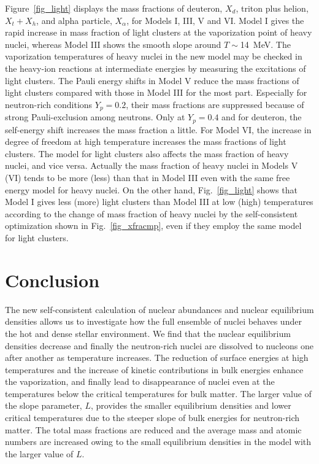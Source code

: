 \documentclass[preprint]{revtex4}
\begin{document}
{{{%
Figure~\ref{fig_light} displays the mass fractions of deuteron, $X_d$, triton plus helion, $X_t+X_h$, and alpha particle, $X_{\alpha}$, for  Models I, III, V and VI. 
{Model I gives the rapid increase in mass fraction of light clusters at the vaporization point of heavy nuclei, whereas Model III shows the smooth slope around $T\sim$14~MeV. 
The vaporization temperatures of heavy nuclei in the new model  may be checked in the heavy-ion reactions at intermediate energies by measuring  the excitations of light clusters.}
The Pauli energy shifts in  Model V reduce the mass fractions of light clusters compared with those in Model III for the most part. 
Especially for neutron-rich conditions $Y_p=0.2$, their mass fractions are suppressed because of strong Pauli-exclusion among neutrons. Only at $Y_p=0.4$ and for deuteron, the self-energy shift increases the mass fraction a little.
For Model VI, the increase in degree of freedom  at high temperature increases the mass fractions of light clusters.
The model for light clusters also affects the mass fraction of heavy nuclei,  and vice versa. Actually the mass fraction of heavy nuclei  in Models V (VI) tends to be more (less) than that in Model III even with the same free energy model for heavy nuclei.
On the other hand, Fig.~\ref{fig_light} shows that  Model I gives less (more) light clusters than Model III at low (high) temperatures according to the change of mass fraction of heavy nuclei by the self-consistent optimization shown in Fig.~\ref{fig_xfracmp}, 
even if they employ the same model for light clusters.

\section{Conclusion \label{sec:conc}}

The new self-consistent calculation of nuclear abundances and nuclear equilibrium densities 
allows us to investigate how the full ensemble of nuclei behaves under the hot and dense
stellar environment.
We find that the nuclear equilibrium densities decrease  and  finally  the neutron-rich nuclei are dissolved
 to nucleons  one after another  as temperature increases. 
The reduction of surface energies at high temperatures 
and  the increase of kinetic contributions in bulk energies enhance the vaporization,  and finally  lead to disappearance of nuclei even at the temperatures
 below the critical temperatures for bulk matter.
The larger value of the slope parameter, $L$, provides the smaller equilibrium densities and
  lower critical temperatures due to the steeper slope of bulk energies for neutron-rich matter.
The total  mass fractions are reduced and the average mass and atomic numbers are increased owing to the small equilibrium densities in the model with the larger value of $L$. 

}}}
\end{document}
